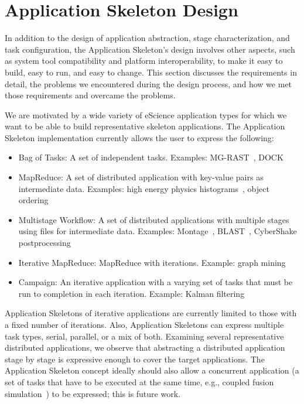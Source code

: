 \documentclass[preprint,12pt]{elsarticle}
\newcommand{\katznote}[1]{ {\textcolor{blue}    { ***Dan:   #1 }}}
\newcommand{\zhaonote}[1]{{\textcolor{darkgreen}{ ***Zhao:  #1 }}}
\newcommand{\katznote}[1]{}
\newcommand{\zhaonote}[1]{}
\begin{document}


\section{Application Skeleton Design}

\label{lb:Design}
In addition to the design of application abstraction, stage characterization, and task configuration, the Application Skeleton's design involves
other aspects, such as system tool compatibility and platform interoperability, to make it easy to build, easy to run, and easy to change. This section discusses
the requirements in detail, the problems we encountered during the design process, and how we met those requirements and overcame the
problems.

We are motivated by a wide variety of eScience application types for which we want to be able to build representative skeleton applications. The Application Skeleton implementation
currently allows the user to express the following:
\begin{itemize}
\item {Bag of Tasks}: A set of independent tasks. Examples: MG-RAST~\cite{MG-RAST}, DOCK~\cite{dock5-06}
\item {MapReduce}: A set of distributed application with key-value pairs as intermediate data. Examples: high energy physics histograms~\cite{SCIMP}, object ordering~\cite{PageRank2}
\item {Multistage Workflow}: A set of distributed applications with multiple stages using files for intermediate data. Examples: Montage~\cite{montage1}, BLAST~\cite{ParallelBlast}, CyberShake postprocessing~\cite{SCEC07}
\item {Iterative MapReduce}: MapReduce with iterations. Example: %
graph mining~\cite{PREGEL}
\item {Campaign}: An iterative application with a varying set of tasks that must be run to completion in each iteration. Example: Kalman filtering~\cite{KALMAN}
\end{itemize}

Application Skeletons of iterative applications are currently limited to those with a fixed number of iterations. Also, Application Skeletons  can express multiple task types, serial, parallel, or a mix of both. 
Examining several representative distributed applications, we observe
that abstracting a distributed application stage by stage is expressive enough to cover the target applications.
The Application Skeleton concept ideally should also allow a concurrent application (a set of tasks that have to be executed at the same time, e.g., coupled fusion simulation~\cite{klasky:journphy:2005}) to be expressed; this is future work.
\end{document}
